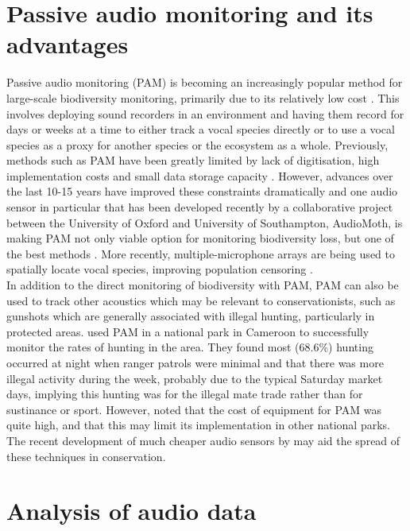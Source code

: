 \section{Passive audio monitoring and its advantages}

Passive audio monitoring (PAM) is becoming an increasingly popular method for large-scale biodiversity monitoring, primarily due to its relatively low cost \citep{Browning2017}. This involves deploying sound recorders in an environment and having them record for days or weeks at a time to either track a vocal species directly or to use a vocal species as a proxy for another species or the ecosystem as a whole. Previously, methods such as PAM have been greatly limited by lack of digitisation, high implementation costs and small data storage capacity \citep{Merchant2015}. However, advances over the last 10-15 years have improved these constraints dramatically and one audio sensor in particular that has been developed recently by a collaborative project between the University of Oxford and University of Southampton, AudioMoth, is making PAM not only viable option for monitoring biodiversity loss, but one of the best methods \citep{Hill2018}. More recently, multiple-microphone arrays are being used to spatially locate vocal species, improving population censoring \citep{Blumstein2011, Stevenson2015}.\\

\noindent In addition to the direct monitoring of biodiversity with PAM, PAM can also be used to track other acoustics which may be relevant to conservationists, such as gunshots which are generally associated with illegal hunting, particularly in protected areas. \cite{Astaras2017} used PAM in a national park in Cameroon to successfully monitor the rates of hunting in the area. They found most (68.6\%) hunting occurred at night when ranger patrols were minimal and that there was more illegal activity during the week, probably due to the typical Saturday market days, implying this hunting was for the illegal mate trade rather than for sustinance or sport. However, \cite{Astaras2017} noted that the cost of equipment for PAM was quite high, and that this may limit its implementation in other national parks. The recent development of much cheaper audio sensors by \cite{Hill2018} may aid the spread of these techniques in conservation.

\section{Analysis of audio data}

